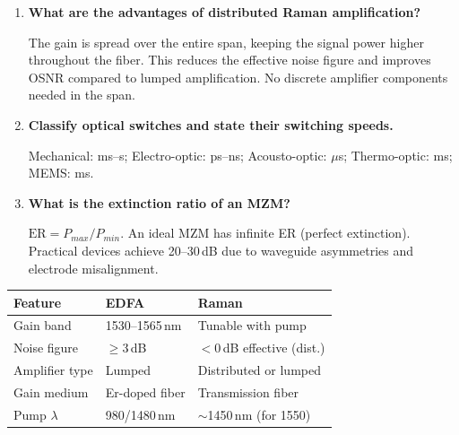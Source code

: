 \documentclass[12pt,a4paper]{article}
\newcommand{\Q}[1]{\textbf{#1}\par\noindent\ignorespaces}
\renewcommand{\arraystretch}{1.45}
\begin{document}
\begin{tcolorbox}[exambox, title={\textbf{Frequently Asked / Viva Questions}}]
\begin{enumerate}[topsep=0pt, label=\textbf{Q\arabic*.}, itemsep=5pt]
  \item \Q{What are the advantages of distributed Raman amplification?}
    The gain is spread over the entire span, keeping the signal power higher throughout the fiber. This reduces the effective noise figure and improves OSNR compared to lumped amplification. No discrete amplifier components needed in the span.
  \item \Q{Classify optical switches and state their switching speeds.}
    Mechanical: ms--s; Electro-optic: ps--ns; Acousto-optic: $\mu$s; Thermo-optic: ms; MEMS: ms.
  \item \Q{What is the extinction ratio of an MZM?}
    $\text{ER} = P_{max}/P_{min}$. An ideal MZM has infinite ER (perfect extinction). Practical devices achieve 20--30\,dB due to waveguide asymmetries and electrode misalignment.
\end{enumerate}
\end{tcolorbox}

\begin{tcolorbox}[tikzbox, title={EDFA vs Raman --- Quick Comparison}]
\centering
{\renewcommand{\arraystretch}{1.45}
\begin{tabularx}{\linewidth}{|B{3.2cm}|Y|Y|}
\hline
\textbf{Feature} & \textbf{EDFA} & \textbf{Raman} \\
\hline
Gain band & 1530--1565\,nm & Tunable with pump \\
\hline
Noise figure & $\geq$3\,dB & $<$0\,dB effective (dist.) \\
\hline
Amplifier type & Lumped & Distributed or lumped \\
\hline
Gain medium & Er-doped fiber & Transmission fiber \\
\hline
Pump $\lambda$ & 980/1480\,nm & $\sim$1450\,nm (for 1550) \\
\hline
\end{tabularx}}
\end{tcolorbox}
\end{document}

